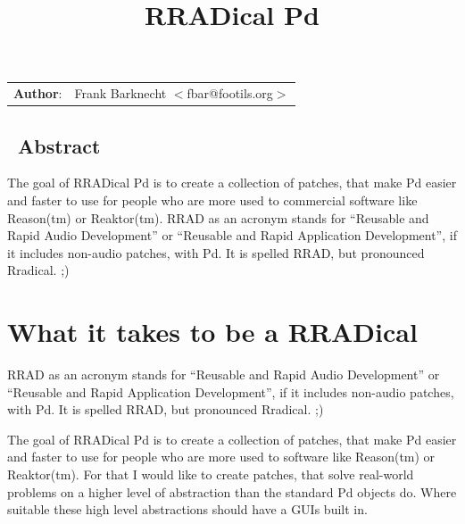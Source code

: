 \documentclass[10pt,english]{scrartcl}
\title{RRADical Pd}
\author{}
\date{}
\newlength{\docinfowidth}
\begin{document}
\maketitle

\begin{center}
\begin{tabularx}{\docinfowidth}{lX}
\textbf{Author}: &
	Frank Barknecht {$<$}fbar@footils.org{$>$} \\
\end{tabularx}
\end{center}
\subsection*{~\hfill Abstract\hfill ~}

The goal of RRADical Pd is to create a collection of patches, that make
Pd easier and faster to use for people who are more used to commercial
software like Reason(tm) or Reaktor(tm).  RRAD as an acronym stands for
``Reusable and Rapid Audio Development'' or ``Reusable and Rapid
Application Development'', if it includes non-audio patches, with Pd. It
is spelled RRAD, but pronounced Rradical. ;)




\hypertarget{what-it-takes-to-be-a-rradical}{}
\section*{What it takes to be a RRADical}

RRAD as an acronym stands for ``Reusable and Rapid Audio Development'' or
``Reusable and Rapid Application Development'', if it includes non-audio
patches, with Pd. It is spelled RRAD, but pronounced Rradical. ;)

The goal of RRADical Pd is to create a collection of patches, that make Pd
easier and faster to use for people who are more used to software like Reason(tm)
or Reaktor(tm). For that I would like to create patches, that solve real-world
problems on a higher level of abstraction than the standard Pd objects do. 
Where suitable these high level abstractions should have a GUIs
built in.
\end{document}
